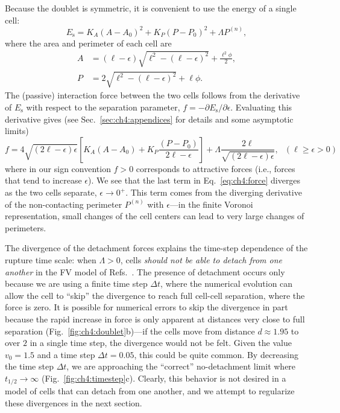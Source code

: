 Because the doublet is symmetric, it is convenient to use the energy of a single cell:
\begin{equation}
\label{eq:ch4:single-cell}
    E_\mathrm{s}=K_A(A-A_0)^2+K_P(P-P_0)^2+\Lambda P^{(n)},
\end{equation}
where the area and perimeter of each cell are
\begin{align}
    A&=(\ell-\epsilon)\sqrt{\ell^2-(\ell-\epsilon)^2}+\frac{\ell^2\phi}{2},\nonumber\\
    P&=2\sqrt{\ell^2-(\ell-\epsilon)^2}+\ell\phi.\nonumber
\end{align}
The (passive) interaction force between the two cells follows from the derivative of $E_\mathrm{s}$ with respect to the separation parameter,
$f=-\partial E_\mathrm{s}/\partial\epsilon$.
Evaluating this derivative gives (see Sec.~\ref{sec:ch4:appendices} for details and some asymptotic limits)
\begin{equation}
\label{eq:ch4:force}
    f=4\sqrt{(2\ell-\epsilon)\epsilon}\left[K_A(A-A_0)+ K_P\dfrac{(P-P_0)}{2\ell-\epsilon}\right] + {\Lambda}\dfrac{2\ell}{\sqrt{(2\ell-\epsilon)\epsilon}},~~~(\ell\geqslant\epsilon>0)
\end{equation}
where in our sign convention $f>0$ corresponds to attractive forces (i.e., forces that tend to increase $\epsilon$). We see that the last term in Eq.~\eqref{eq:ch4:force} diverges as the two cells separate, $\epsilon \to 0^+$. This term comes from the diverging derivative of the non-contacting perimeter $P^{(n)}$ with $\epsilon$---in the finite Voronoi representation, small changes of the cell centers can lead to very large changes of perimeters.

The divergence of the detachment forces explains the time-step dependence of the rupture time scale: when $\Lambda > 0$, cells \emph{should not be able to detach from one another} in the FV model of Refs.~\cite{huang2023bridging, teomy2018confluent}. The presence of detachment occurs only because we are using a finite time step $\Delta t$, where the numerical evolution can allow the cell to ``skip'' the divergence to reach full cell-cell separation, where the force is zero.
It is possible for numerical errors to skip the divergence in part because the rapid increase in force is only apparent at distances very close to full separation (Fig.~\ref{fig:ch4:doublet}b)---if the cells move from distance $d\approx 1.95$ to over $2$ in a single time step, the divergence would not be felt. Given the value $v_0 = 1.5$ and a time step $\Delta t = 0.05$, this could be quite common.
By decreasing the time step $\Delta t$, we are approaching the ``correct'' no-detachment limit where $t_{1/2}\to\infty$ (Fig.~\ref{fig:ch4:timestep}c). Clearly, this behavior is not desired in a model of cells that can detach from one another, and we attempt to regularize these divergences in the next section.


